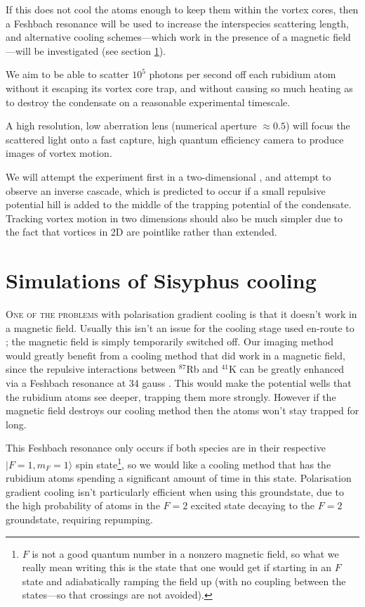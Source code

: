 If this does not cool the atoms enough to keep them within the vortex cores, then a Feshbach resonance will be used to increase the interspecies scattering length, and alternative cooling schemes---which work in the presence of a magnetic field---will be investigated (see section \ref{sec:atoms}).

We aim to be able to scatter $10^5$ photons per second off each rubidium atom without it escaping its vortex core trap, and without causing so much heating as to destroy the condensate on a reasonable experimental timescale.

A high resolution, low aberration lens (numerical aperture $\approx 0.5$) will focus the scattered light onto a fast capture, high quantum efficiency camera to produce images of vortex motion.

We will attempt the experiment first in a two-dimensional \bec, and attempt to observe an inverse cascade, which is predicted to occur if a small repulsive potential hill is added to the middle of the trapping potential of the condensate. Tracking vortex motion in two dimensions should also be much simpler due to the fact that vortices in 2D are pointlike rather than extended.


\section{Simulations of Sisyphus cooling}\label{sec:atoms}

\lettrine[lines=3]{O}{ne of the problems} with polarisation gradient cooling is that it doesn't work in a magnetic field. Usually this isn't an issue for the cooling stage used en-route to \bec; the magnetic field is simply temporarily switched off. Our imaging method would greatly benefit from a cooling method that did work in a magnetic field, since the repulsive interactions between $^{87}$Rb and $^{41}$K can be greatly enhanced via a Feshbach resonance at 34 gauss \cite{thalhammer_double_2008}. This would make the potential wells that the rubidium atoms see deeper, trapping them more strongly. However if the magnetic field destroys our cooling method then the atoms won't stay trapped for long.

This Feshbach resonance only occurs if both species are in their respective \mbox{$|F=1,m_F=1\rangle$} spin state\footnote{$F$ is not a good quantum number in a nonzero magnetic field, so what we really mean writing this is the state that one would get if starting in an $F$ state and adiabatically ramping the field up (with no coupling between the states---so that crossings are not avoided).}, so we would like a cooling method that has the rubidium atoms spending a significant amount of time in this state. Polarisation gradient cooling isn't particularly efficient when using this groundstate, due to the high probability of atoms in the $F=2$ excited state decaying to the $F=2$ groundstate, requiring repumping.

